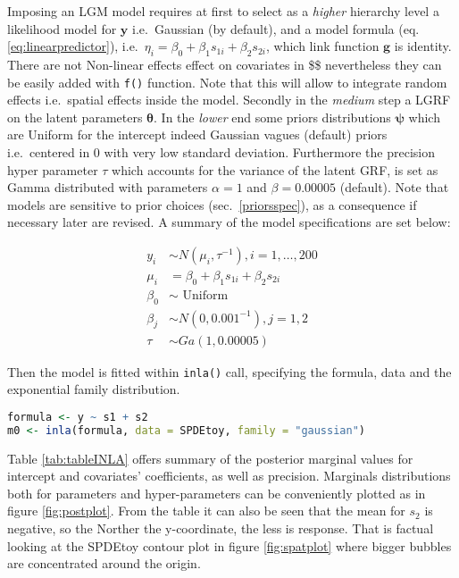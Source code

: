\documentclass[
  12pt,
  a4paper,
  oneside]{book}
\newcommand{\passthrough}[1]{#1}
\theoremstyle{definition}
\theoremstyle{definition}
\theoremstyle{definition}
\theoremstyle{remark}
\begin{document}
Imposing an LGM model requires at first to select as a \emph{higher} hierarchy level a likelihood model for \(\mathbf{y}\) i.e.~Gaussian (by default), and a model formula (eq. \eqref{eq:linearpredictor}), i.e.~\(\eta_{i}=\beta_{0}+\beta_{1} s_{1 i}+\beta_{2} s_{2 i}\), which link function \(\mathbf{g}\) is identity. There are not Non-linear effects effect on covariates in \$\eta \$ nevertheless they can be easily added with \passthrough{\lstinline!f()!} function. Note that this will allow to integrate random effects i.e.~spatial effects inside the model. Secondly in the \emph{medium} step a LGRF on the latent parameters \(\boldsymbol\theta\). In the \emph{lower} end some priors distributions \(\boldsymbol\psi\) which are Uniform for the intercept indeed Gaussian vagues (default) priors i.e.~centered in 0 with very low standard deviation. Furthermore the precision hyper parameter \(\tau\) which accounts for the variance of the latent GRF, is set as Gamma distributed with parameters \(\alpha = 1\) and \(\beta = 0.00005\) (default). Note that models are sensitive to prior choices (sec.~\ref{priorsspec}), as a consequence if necessary later are revised.
A summary of the model specifications are set below:

\begin{equation} 
\begin{split}
y_{i} & \sim N\left(\mu_{i}, \tau^{-1}\right), i=1, \ldots, 200 \\
\mu_{i} &=\beta_{0}+\beta_{1} s_{1 i}+\beta_{2} s_{2 i} \\
\beta_{0} & \sim \text { Uniform } \\
\beta_{j} & \sim N\left(0,0.001^{-1}\right), j=1,2 \\
\tau & \sim G a(1,0.00005)
\end{split}
\end{equation}

Then the model is fitted within \passthrough{\lstinline!inla()!} call, specifying the formula, data and the exponential family distribution.

\begin{lstlisting}[language=R]
formula <- y ~ s1 + s2
m0 <- inla(formula, data = SPDEtoy, family = "gaussian")
\end{lstlisting}

Table \ref{tab:tableINLA} offers summary of the posterior marginal values for intercept and covariates' coefficients, as well as precision. Marginals distributions both for parameters and hyper-parameters can be conveniently plotted as in figure \ref{fig:postplot}. From the table it can also be seen that the mean for \(s_2\) is negative, so the Norther the y-coordinate, the less is response. That is factual looking at the SPDEtoy contour plot in figure \ref{fig:spatplot} where bigger bubbles are concentrated around the origin.
\end{document}
